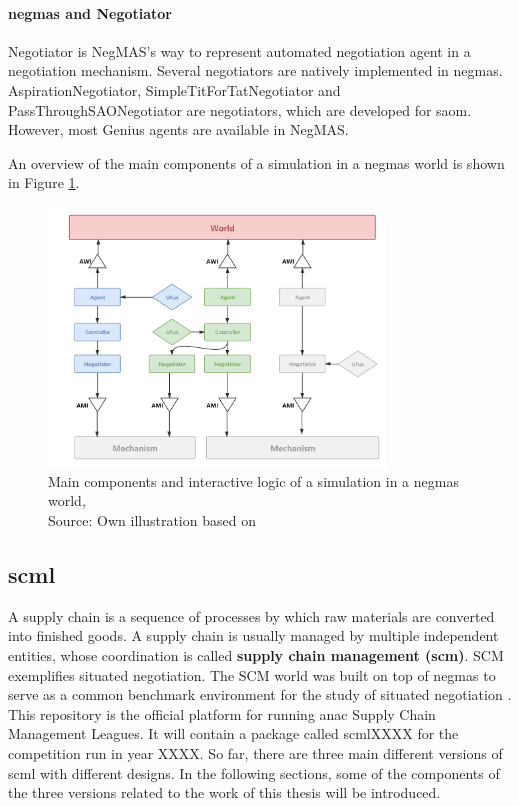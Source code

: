 \paragraph{\gls{negmas} and Negotiator} Negotiator is NegMAS's way to represent automated negotiation agent in a negotiation mechanism. Several negotiators are natively implemented in \gls{negmas}. AspirationNegotiator, SimpleTitForTatNegotiator and PassThroughSAONegotiator are negotiators, which are developed for \gls{saom}. However, most Genius agents are available in NegMAS.

An overview of the main components of a simulation in a \gls{negmas} world is shown in Figure \ref{fig:overview-negmas}.

\begin{figure}[htbp]
\centering
\includegraphics[width=0.8\textwidth]{./images/overview-negmas.png}
\caption{Main components and interactive logic of a simulation in a \gls{negmas} world, \\
Source: Own illustration based on\parencite{Mohammad2019}}
\label{fig:overview-negmas}
\end{figure}

\subsection{\gls{scml}} \label{background-scml}
A supply chain is a sequence of processes by which raw materials are converted into finished goods. A supply chain is usually managed by multiple independent entities, whose coordination is called \textbf{supply chain management (\gls{scm})}. SCM exemplifies situated negotiation. The SCM world was built on top of  \gls{negmas} to serve as a common benchmark environment for the study of situated negotiation \parencite{Mohammad2019}. This repository is the official platform for running \gls{anac} Supply Chain Management Leagues. It will contain a package called scmlXXXX for the competition run in year XXXX. So far, there are three main different versions of \gls{scml} with different designs. In the following sections, some of the components of the three versions related to the work of this thesis will be introduced. 


